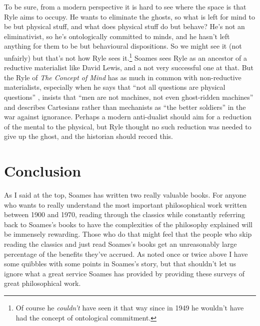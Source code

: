 To be sure, from a modern perspective it is hard to see where the space is that Ryle aims to occupy. He wants to eliminate the ghosts, so what is left for mind to be but physical stuff, and what does physical stuff do but behave? He's not an eliminativist, so he's ontologically committed to minds, and he hasn't left anything for them to be but behavioural dispositions. So we might see it (not unfairly) but that's not how Ryle sees it.\footnote{Of course he \textit{couldn't} have seen it that way since in 1949 he wouldn't have had the concept of ontological commitment.} Soames sees Ryle as an ancestor of a reductive materialist like David Lewis, and a not very successful one at that. But the Ryle of \textit{The Concept of Mind} has as much in common with non-reductive materialists, especially when he says that ``not all questions are physical questions'' \citeyearpar[77]{Ryle1949}, insists that ``men are not machines, not even ghost-ridden machines'' \citeyearpar[81]{Ryle1949} and describes Cartesians rather than mechanists as ``the better soldiers'' \citeyearpar[330]{Ryle1949} in the war against ignorance. Perhaps a modern anti-dualist should aim for a reduction of the mental to the physical, but Ryle thought no such reduction was needed to give up the ghost, and the historian should record this.

\section{Conclusion}

As I said at the top, Soames has written two really valuable books. For anyone who wants to really understand the most important philosophical work written between 1900 and 1970, reading through the classics while constantly referring back to Soames's books to have the complexities of the philosophy explained will be immensely rewarding. Those who do that might feel that the people who skip reading the classics and just read Soames's books get an unreasonably large percentage of the benefits they've accrued. As noted once or twice above I have some quibbles with some points in Soames's story, but that shouldn't let us ignore what a great service Soames has provided by providing these surveys of great philosophical work.

